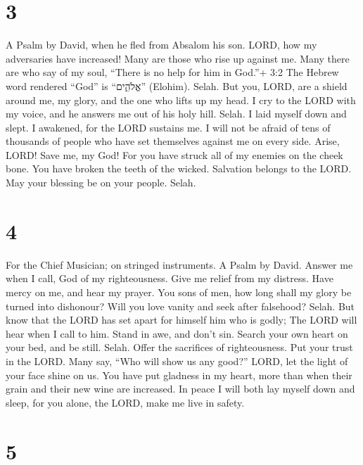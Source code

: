 \hypertarget{section-2}{%
\section{3}\label{section-2}}

A Psalm by David, when he fled from Absalom his son.  LORD,
how my adversaries have increased! Many are those who rise up against
me.  Many there are who say of my soul, ``There is no help
for him in God.''+ 3:2 The Hebrew word rendered ``God'' is ``אֱלֹהִ֑ים''
(Elohim). Selah.  But you, LORD, are a shield around me, my
glory, and the one who lifts up my head.  I cry to the LORD
with my voice, and he answers me out of his holy hill. Selah.
 I laid myself down and slept. I awakened, for the LORD
sustains me.  I will not be afraid of tens of thousands of
people who have set themselves against me on every side. 
Arise, LORD! Save me, my God! For you have struck all of my enemies on
the cheek bone. You have broken the teeth of the wicked. 
Salvation belongs to the LORD. May your blessing be on your people.
Selah.

\hypertarget{section-3}{%
\section{4}\label{section-3}}

For the Chief Musician; on stringed instruments. A Psalm by David.
 Answer me when I call, God of my righteousness. Give me
relief from my distress. Have mercy on me, and hear my prayer.
 You sons of men, how long shall my glory be turned into
dishonour? Will you love vanity and seek after falsehood? Selah.
 But know that the LORD has set apart for himself him who is
godly; The LORD will hear when I call to him.  Stand in awe,
and don't sin. Search your own heart on your bed, and be still. Selah.
 Offer the sacrifices of righteousness. Put your trust in
the LORD.  Many say, ``Who will show us any good?'' LORD,
let the light of your face shine on us.  You have put
gladness in my heart, more than when their grain and their new wine are
increased.  In peace I will both lay myself down and sleep,
for you alone, the LORD, make me live in safety.

\hypertarget{section-4}{%
\section{5}\label{section-4}}

